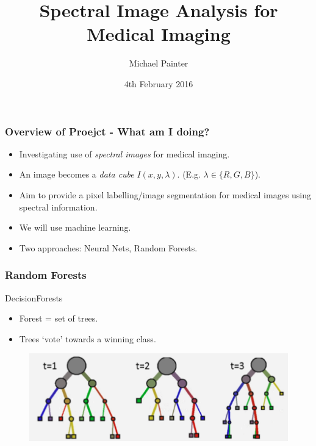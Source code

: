\documentclass{beamer}
\title[Short title]{Spectral Image Analysis for \\Medical Imaging} %
\author{Michael Painter} %
\institute[UoC] %
{
University of Cambridge \\ %
\medskip
\textit{mp703@cam.ac.uk} %
}
\date{4th February 2016} %
\begin{document}
\begin{frame}
\titlepage %
\end{frame}


\begin{frame}
    \frametitle{Overview of Proejct - What am I doing?}

    \begin{itemize}
        \item Investigating use of \textit{spectral images} for medical imaging. 
        \item An image becomes a \textit{data cube} $I(x,y,\lambda)$. (E.g. $\lambda \in \{R, G, B\}$).
        \item Aim to provide a pixel labelling/image segmentation for medical images using spectral information.
        \item We will use machine learning.
        \item Two approaches: Neural Nets, Random Forests.
    \end{itemize}
\end{frame}



\begin{frame}
    \frametitle{Random Forests}

    \begin{block}{DecisionForests}
        \begin{itemize}
            \item Forest = set of trees.
            \item Trees `vote' towards a winning class.
        \end{itemize}

        \begin{figure}[H]
            \centering
            \includegraphics[scale=0.25]{Forests.png}
            \caption{}
        \end{figure}
    \end{block}
\end{frame}
\end{document}

